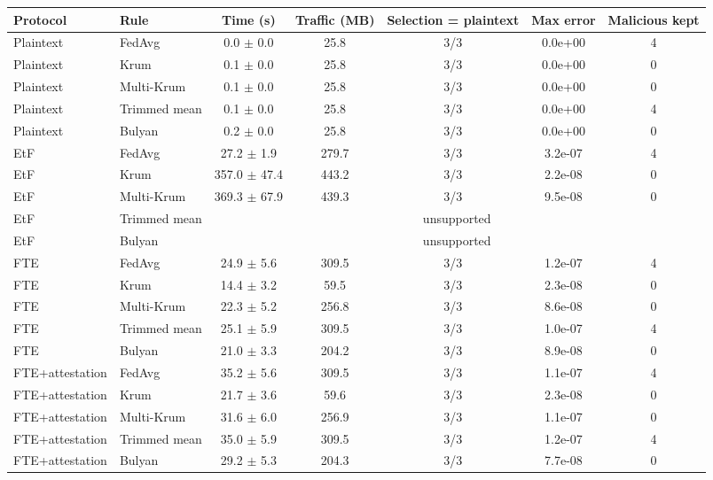 \begin{tabular}{llccccc}
\toprule
Protocol & Rule & Time (s) & Traffic (MB) & Selection = plaintext & Max error & Malicious kept \\
\midrule
Plaintext & FedAvg & 0.0 $\pm$ 0.0 & 25.8 & 3/3 & 0.0e+00 & 4 \\
Plaintext & Krum & 0.1 $\pm$ 0.0 & 25.8 & 3/3 & 0.0e+00 & 0 \\
Plaintext & Multi-Krum & 0.1 $\pm$ 0.0 & 25.8 & 3/3 & 0.0e+00 & 0 \\
Plaintext & Trimmed mean & 0.1 $\pm$ 0.0 & 25.8 & 3/3 & 0.0e+00 & 4 \\
Plaintext & Bulyan & 0.2 $\pm$ 0.0 & 25.8 & 3/3 & 0.0e+00 & 0 \\
EtF & FedAvg & 27.2 $\pm$ 1.9 & 279.7 & 3/3 & 3.2e-07 & 4 \\
EtF & Krum & 357.0 $\pm$ 47.4 & 443.2 & 3/3 & 2.2e-08 & 0 \\
EtF & Multi-Krum & 369.3 $\pm$ 67.9 & 439.3 & 3/3 & 9.5e-08 & 0 \\
EtF & Trimmed mean & \multicolumn{5}{c}{unsupported} \\
EtF & Bulyan & \multicolumn{5}{c}{unsupported} \\
FTE & FedAvg & 24.9 $\pm$ 5.6 & 309.5 & 3/3 & 1.2e-07 & 4 \\
FTE & Krum & 14.4 $\pm$ 3.2 & 59.5 & 3/3 & 2.3e-08 & 0 \\
FTE & Multi-Krum & 22.3 $\pm$ 5.2 & 256.8 & 3/3 & 8.6e-08 & 0 \\
FTE & Trimmed mean & 25.1 $\pm$ 5.9 & 309.5 & 3/3 & 1.0e-07 & 4 \\
FTE & Bulyan & 21.0 $\pm$ 3.3 & 204.2 & 3/3 & 8.9e-08 & 0 \\
FTE+attestation & FedAvg & 35.2 $\pm$ 5.6 & 309.5 & 3/3 & 1.1e-07 & 4 \\
FTE+attestation & Krum & 21.7 $\pm$ 3.6 & 59.6 & 3/3 & 2.3e-08 & 0 \\
FTE+attestation & Multi-Krum & 31.6 $\pm$ 6.0 & 256.9 & 3/3 & 1.1e-07 & 0 \\
FTE+attestation & Trimmed mean & 35.0 $\pm$ 5.9 & 309.5 & 3/3 & 1.2e-07 & 4 \\
FTE+attestation & Bulyan & 29.2 $\pm$ 5.3 & 204.3 & 3/3 & 7.7e-08 & 0 \\
\bottomrule
\end{tabular}
